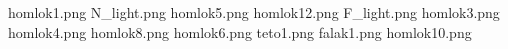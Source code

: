 homlok1.png
N_light.png
homlok5.png
homlok12.png
F_light.png
homlok3.png
homlok4.png
homlok8.png
homlok6.png
teto1.png
falak1.png
homlok10.png
